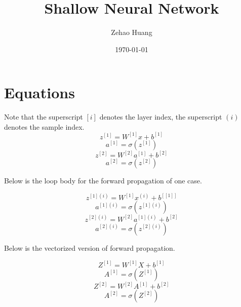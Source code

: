 \documentclass{article}
\title{Shallow Neural Network}
\author{Zehao Huang}
\date{\today}
\begin{document}
    \maketitle

    \section{Equations}
    
    Note that the superscript $[i]$ denotes the layer index, 
    the superscript $(i)$ denotes the sample index.
    \begin{equation}
        z^{[1]} = W^{[1]}x + b^{[1]}
    \end{equation}
    \begin{equation}
        a^{[1]} = \sigma(z^{[1]})
    \end{equation}
    \begin{equation}
        z^{[2]} = W^{[2]}a^{[1]} + b^{[2]}
    \end{equation}
    \begin{equation}
        a^{[2]} = \sigma(z^{[2]})
    \end{equation}

    Below is the loop body for the forward propagation of one case.

    \begin{equation}
        z^{[1](i)} = W^{[1]}x^{(i)} + b^{[[1]]}
    \end{equation}
    \begin{equation}
        a^{[1](i)} = \sigma(z^{[1](i)})
    \end{equation}
    \begin{equation}
        z^{[2](i)} = W^{[2]}a^{[1](i)} + b^{[2]}
    \end{equation}
    \begin{equation}
        a^{[2](i)} = \sigma(z^{[2](i)})
    \end{equation}

    Below is the vectorized version of forward propagation.

    \begin{equation}
        Z^{[1]} = W^{[1]}X + b^{[1]}
    \end{equation}
    \begin{equation}
        A^{[1]} = \sigma(Z^{[1]})
    \end{equation}
    \begin{equation}
        Z^{[2]} = W^{[2]}A^{[1]} + b^{[2]}
    \end{equation}
    \begin{equation}
        A^{[2]} = \sigma(Z^{[2]})
    \end{equation}
\end{document}

